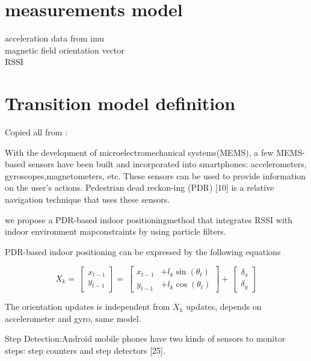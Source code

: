 
\section{measurements model}

acceleration data from imu \\
magnetic field orientation vector \\
RSSI


\section{Transition model definition}

Copied all from \cite{articleXia}:

With  the  development  of  microelectromechanical  systems(MEMS),  a  few  MEMS-based  sensors  have  been  built  and
incorporated  into  smartphones:  accelerometers,  gyroscopes,magnetometers,  etc.  These  sensors  can  be  used  to  provide information  on  the  user’s  actions.  Pedestrian  dead  reckon-ing  (PDR)  [10]  is  a  relative  navigation  technique  that  uses these sensors.

we propose a PDR-based  indoor positioningmethod  that  integrates  RSSI  with  indoor  environment  mapconstraints by using particle filters.

PDR-based indoor positioning can be expressed by the following equations

\begin{equation}
X_k = \
\begin{bmatrix} 
x_{t-1} \\
y_{t-1} 
\end{bmatrix} = \
\begin{bmatrix} 
x_{t-1} &+ l_k \sin(\theta_t) \\
y_{t-1} &+ l_k \cos(\theta_t) 
\end{bmatrix} + \
\begin{bmatrix} 
\delta_{x} \\
\delta_{y} 
\end{bmatrix}
\end{equation}

The orientation  updates is independent from $X_k$ updates, depends on accelerometer and gyro, same model.

Step   Detection:Android   mobile   phones   have   two kinds  of  sensors  to  monitor  steps:  step  counters  and  step detectors [25]. 


